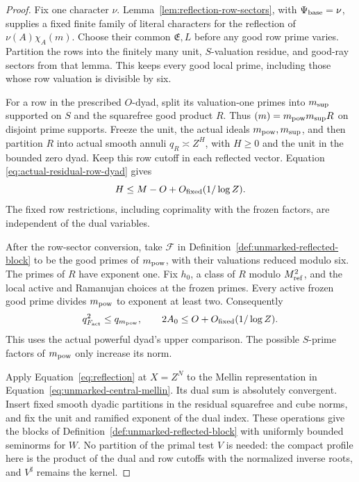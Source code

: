 \documentclass[11pt,a4paper]{article}
\numberwithin{equation}{section}
\numberwithin{figure}{section}
\theoremstyle{definition}
\theoremstyle{remark}
\begin{document}
\begin{proof}
Fix one character $\nu$.  Lemma~\ref{lem:reflection-row-sectors}, with
$\Psi_{\rm base}=\nu$, supplies a fixed finite family of literal characters
for the reflection of $\nu(A)\chi_A(m)$.  Choose their common $\mathfrak E,L$
before any good row prime varies.  Partition the rows into the finitely many
unit, $S$-valuation residue, and good-ray sectors from that lemma.  This keeps every
good local prime, including those whose row valuation is divisible by six.

For a row in the prescribed $O$-dyad, split its valuation-one primes into
$m_{\rm sup}$ supported on $S$ and the squarefree good product $R$.  Thus
$(m)=m_{\rm pow}m_{\rm sup}R$ on disjoint prime supports.  Freeze the unit,
the actual ideals $m_{\rm pow},m_{\rm sup}$, and then partition $R$ into
actual smooth annuli $q_R\asymp Z^H$, with $H\ge0$ and the unit in the
bounded zero dyad.  Keep this row cutoff in each reflected vector.  Equation
\eqref{eq:actual-residual-row-dyad} gives
\begin{equation}\label{eq:unmarked-row-width}
 H\le M-O+O_{\rm fixed}(1/\log Z).
\end{equation}
The fixed row restrictions, including coprimality with the frozen factors,
are independent of the dual variables.

After the row-sector conversion, take $\mathcal F$ in
Definition~\ref{def:unmarked-reflected-block} to be the good primes of
$m_{\rm pow}$, with their valuations reduced modulo six.  The primes of
$R$ have exponent one.  Fix $h_0$, a class of $R$ modulo $M_{\rm ref}^2$,
and the local active and Ramanujan choices at the frozen primes.  Every
active frozen good prime divides $m_{\rm pow}$ to exponent at least two.
Consequently
\begin{equation}\label{eq:unmarked-powerful-radical}
 q_{F_{\rm act}}^2\le q_{m_{\rm pow}},\qquad
 2A_0\le O+O_{\rm fixed}(1/\log Z).
\end{equation}
This uses the actual powerful dyad's upper comparison.  The possible
$S$-prime factors of $m_{\rm pow}$ only increase its norm.

Apply Equation~\eqref{eq:reflection} at $X=Z^N$ to the Mellin representation
in Equation~\eqref{eq:unmarked-central-mellin}.  Its dual sum is absolutely
convergent.  Insert fixed smooth dyadic partitions in the residual squarefree
and cube norms, and fix the unit and ramified exponent of the dual index.
These operations give the blocks of Definition~\ref{def:unmarked-reflected-block}
with uniformly bounded seminorms for $W$.  No partition of the primal test
$V$ is needed: the compact profile here is the product of the dual and row
cutoffs with the normalized inverse roots, and $V^\sharp$ remains the kernel.


\end{proof}
\end{document}
